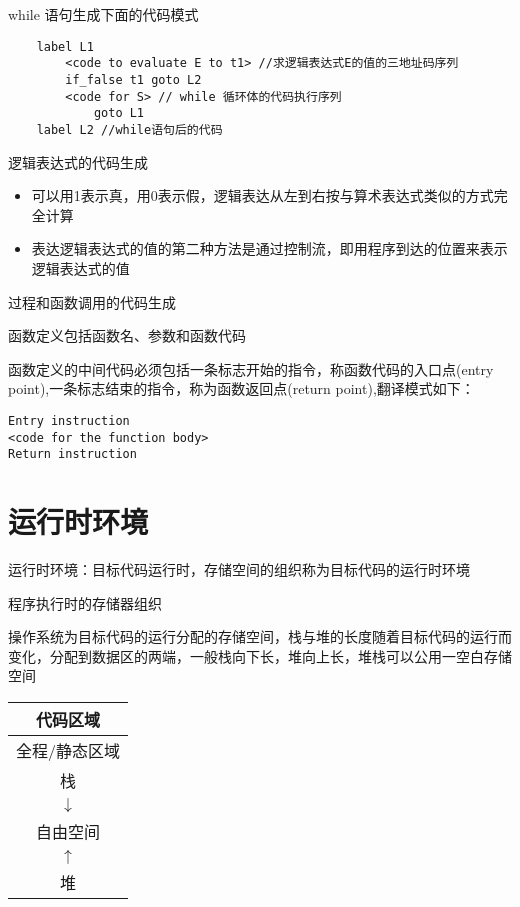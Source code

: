\documentclass[utf8]{ctexart}
\begin{document}
while 语句生成下面的代码模式
\begin{lstlisting}
    label L1
        <code to evaluate E to t1> //求逻辑表达式E的值的三地址码序列
        if_false t1 goto L2
        <code for S> // while 循环体的代码执行序列
            goto L1
    label L2 //while语句后的代码
\end{lstlisting}


逻辑表达式的代码生成
\begin{itemize}
    \item 可以用1表示真，用0表示假，逻辑表达从左到右按与算术表达式类似的方式完全计算
    \item 表达逻辑表达式的值的第二种方法是通过控制流，即用程序到达的位置来表示逻辑表达式的值
\end{itemize}

\noindent 过程和函数调用的代码生成

函数定义包括函数名、参数和函数代码

函数定义的中间代码必须包括一条标志开始的指令，称函数代码的入口点(entry point),一条标志结束的指令，称为函数返回点(return point),翻译模式如下：

\begin{lstlisting}
Entry instruction
<code for the function body>
Return instruction
\end{lstlisting}


\section{运行时环境}

运行时环境：目标代码运行时，存储空间的组织称为目标代码的运行时环境

程序执行时的存储器组织

操作系统为目标代码的运行分配的存储空间，栈与堆的长度随着目标代码的运行而变化，分配到数据区的两端，一般栈向下长，堆向上长，堆栈可以公用一空白存储空间

\begin{center}
\begin{tabular}{|c|}
\hline
代码区域 \\
\hline
全程/静态区域  \\
\hline 
栈 \\
$\downarrow$ \\
自由空间 \\ 
$\uparrow$ \\
\hline
堆 \\
\hline
\end{tabular}
\end{center}
\end{document}
